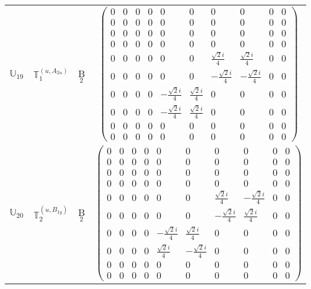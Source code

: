 \documentclass[fleqn,10pt,landscape]{article}
\begin{document}
\begin{itemize}
\begin{center}
\begin{longtable}{c|c|c|c}
$ \mathbb{U}_{19} $ & $\mathbb{T}_{1}^{(u,A_{2u})}$ & B$_{2}$ & $\begin{pmatrix} 0 & 0 & 0 & 0 & 0 & 0 & 0 & 0 & 0 & 0 \\ 0 & 0 & 0 & 0 & 0 & 0 & 0 & 0 & 0 & 0 \\ 0 & 0 & 0 & 0 & 0 & 0 & 0 & 0 & 0 & 0 \\ 0 & 0 & 0 & 0 & 0 & 0 & 0 & 0 & 0 & 0 \\ 0 & 0 & 0 & 0 & 0 & 0 & \frac{\sqrt{2} i}{4} & \frac{\sqrt{2} i}{4} & 0 & 0 \\ 0 & 0 & 0 & 0 & 0 & 0 & - \frac{\sqrt{2} i}{4} & - \frac{\sqrt{2} i}{4} & 0 & 0 \\ 0 & 0 & 0 & 0 & - \frac{\sqrt{2} i}{4} & \frac{\sqrt{2} i}{4} & 0 & 0 & 0 & 0 \\ 0 & 0 & 0 & 0 & - \frac{\sqrt{2} i}{4} & \frac{\sqrt{2} i}{4} & 0 & 0 & 0 & 0 \\ 0 & 0 & 0 & 0 & 0 & 0 & 0 & 0 & 0 & 0 \\ 0 & 0 & 0 & 0 & 0 & 0 & 0 & 0 & 0 & 0 \end{pmatrix}$ \\
$ \mathbb{U}_{20} $ & $\mathbb{T}_{2}^{(u,B_{1g})}$ & B$_{2}$ & $\begin{pmatrix} 0 & 0 & 0 & 0 & 0 & 0 & 0 & 0 & 0 & 0 \\ 0 & 0 & 0 & 0 & 0 & 0 & 0 & 0 & 0 & 0 \\ 0 & 0 & 0 & 0 & 0 & 0 & 0 & 0 & 0 & 0 \\ 0 & 0 & 0 & 0 & 0 & 0 & 0 & 0 & 0 & 0 \\ 0 & 0 & 0 & 0 & 0 & 0 & \frac{\sqrt{2} i}{4} & - \frac{\sqrt{2} i}{4} & 0 & 0 \\ 0 & 0 & 0 & 0 & 0 & 0 & - \frac{\sqrt{2} i}{4} & \frac{\sqrt{2} i}{4} & 0 & 0 \\ 0 & 0 & 0 & 0 & - \frac{\sqrt{2} i}{4} & \frac{\sqrt{2} i}{4} & 0 & 0 & 0 & 0 \\ 0 & 0 & 0 & 0 & \frac{\sqrt{2} i}{4} & - \frac{\sqrt{2} i}{4} & 0 & 0 & 0 & 0 \\ 0 & 0 & 0 & 0 & 0 & 0 & 0 & 0 & 0 & 0 \\ 0 & 0 & 0 & 0 & 0 & 0 & 0 & 0 & 0 & 0 \end{pmatrix}$ \\

\end{longtable}
\end{center}
\end{itemize}
\end{document}
